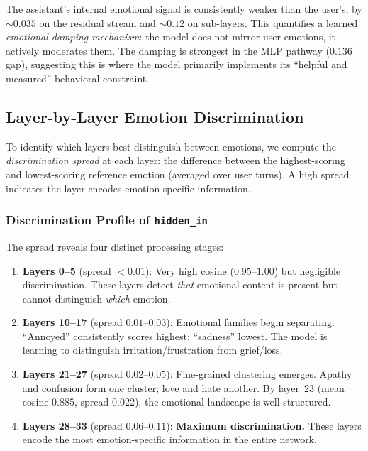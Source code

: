 \documentclass[11pt,a4paper]{article}
\begin{document}
The assistant's internal emotional signal is consistently weaker than the user's, by ${\sim}0.035$ on the residual stream and ${\sim}0.12$ on sub-layers. This quantifies a learned \emph{emotional damping mechanism}: the model does not mirror user emotions, it actively moderates them. The damping is strongest in the MLP pathway ($0.136$ gap), suggesting this is where the model primarily implements its ``helpful and measured'' behavioral constraint.

\subsection{Layer-by-Layer Emotion Discrimination}
\label{sec:layer_analysis}

To identify which layers best distinguish between emotions, we compute the \emph{discrimination spread} at each layer: the difference between the highest-scoring and lowest-scoring reference emotion (averaged over user turns). A high spread indicates the layer encodes emotion-specific information.

\subsubsection{Discrimination Profile of \texttt{hidden\_in}}

The spread reveals four distinct processing stages:

\begin{enumerate}[leftmargin=*]
  \item \textbf{Layers 0--5} (spread $< 0.01$): Very high cosine ($0.95$--$1.00$) but negligible discrimination. These layers detect \emph{that} emotional content is present but cannot distinguish \emph{which} emotion.

  \item \textbf{Layers 10--17} (spread $0.01$--$0.03$): Emotional families begin separating. ``Annoyed'' consistently scores highest; ``sadness'' lowest. The model is learning to distinguish irritation/frustration from grief/loss.

  \item \textbf{Layers 21--27} (spread $0.02$--$0.05$): Fine-grained clustering emerges. Apathy and confusion form one cluster; love and hate another. By layer~23 (mean cosine $0.885$, spread $0.022$), the emotional landscape is well-structured.

  \item \textbf{Layers 28--33} (spread $0.06$--$0.11$): \textbf{Maximum discrimination.} These layers encode the most emotion-specific information in the entire network.
\end{enumerate}
\end{document}
